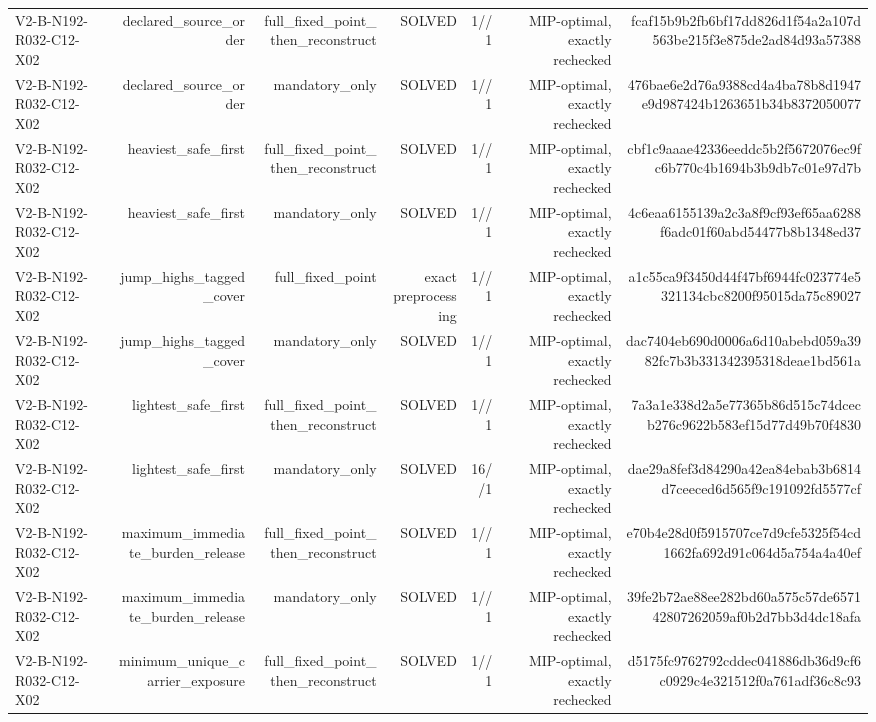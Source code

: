 {\begin{longtable}{lrrrrrr}
V2-B-N192-R032-C12-X02 & declared\_source\_order & full\_fixed\_point\_then\_reconstruct & SOLVED & 1//1 & MIP-optimal, exactly rechecked & fcaf15b9b2fb6bf17dd826d1f54a2a107d563be215f3e875de2ad84d93a57388 \\
V2-B-N192-R032-C12-X02 & declared\_source\_order & mandatory\_only & SOLVED & 1//1 & MIP-optimal, exactly rechecked & 476bae6e2d76a9388cd4a4ba78b8d1947e9d987424b1263651b34b8372050077 \\
V2-B-N192-R032-C12-X02 & heaviest\_safe\_first & full\_fixed\_point\_then\_reconstruct & SOLVED & 1//1 & MIP-optimal, exactly rechecked & cbf1c9aaae42336eeddc5b2f5672076ec9fc6b770c4b1694b3b9db7c01e97d7b \\
V2-B-N192-R032-C12-X02 & heaviest\_safe\_first & mandatory\_only & SOLVED & 1//1 & MIP-optimal, exactly rechecked & 4c6eaa6155139a2c3a8f9cf93ef65aa6288f6adc01f60abd54477b8b1348ed37 \\
V2-B-N192-R032-C12-X02 & jump\_highs\_tagged\_cover & full\_fixed\_point & exact preprocessing & 1//1 & MIP-optimal, exactly rechecked & a1c55ca9f3450d44f47bf6944fc023774e5321134cbc8200f95015da75c89027 \\
V2-B-N192-R032-C12-X02 & jump\_highs\_tagged\_cover & mandatory\_only & SOLVED & 1//1 & MIP-optimal, exactly rechecked & dac7404eb690d0006a6d10abebd059a3982fc7b3b331342395318deae1bd561a \\
V2-B-N192-R032-C12-X02 & lightest\_safe\_first & full\_fixed\_point\_then\_reconstruct & SOLVED & 1//1 & MIP-optimal, exactly rechecked & 7a3a1e338d2a5e77365b86d515c74dcecb276c9622b583ef15d77d49b70f4830 \\
V2-B-N192-R032-C12-X02 & lightest\_safe\_first & mandatory\_only & SOLVED & 16//1 & MIP-optimal, exactly rechecked & dae29a8fef3d84290a42ea84ebab3b6814d7ceeced6d565f9c191092fd5577cf \\
V2-B-N192-R032-C12-X02 & maximum\_immediate\_burden\_release & full\_fixed\_point\_then\_reconstruct & SOLVED & 1//1 & MIP-optimal, exactly rechecked & e70b4e28d0f5915707ce7d9cfe5325f54cd1662fa692d91c064d5a754a4a40ef \\
V2-B-N192-R032-C12-X02 & maximum\_immediate\_burden\_release & mandatory\_only & SOLVED & 1//1 & MIP-optimal, exactly rechecked & 39fe2b72ae88ee282bd60a575c57de657142807262059af0b2d7bb3d4dc18afa \\
V2-B-N192-R032-C12-X02 & minimum\_unique\_carrier\_exposure & full\_fixed\_point\_then\_reconstruct & SOLVED & 1//1 & MIP-optimal, exactly rechecked & d5175fc9762792cddec041886db36d9cf6c0929c4e321512f0a761adf36c8c93 \\

\end{longtable}}
